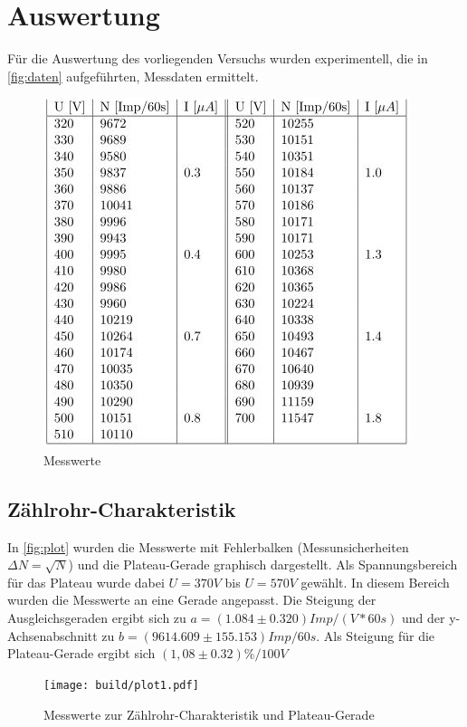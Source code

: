 \section{Auswertung}
\label{sec:Auswertung}
Für die Auswertung des vorliegenden Versuchs wurden experimentell, die in \autoref{fig:daten} aufgeführten, Messdaten ermittelt.

\begin{figure}
  \centering
  \includegraphics{content/daten.JPG}
  \caption{Messwerte \cite{sample}}
  \label{fig:daten}
\end{figure}

\subsection{Zählrohr-Charakteristik}
In \autoref{fig:plot} wurden die Messwerte mit Fehlerbalken (Messunsicherheiten $\Delta N = \sqrt{N}$) und die Plateau-Gerade graphisch dargestellt. Als Spannungsbereich für das Plateau wurde dabei $U=370V$ bis $U=570V$ gewählt. In diesem Bereich wurden die Messwerte an eine Gerade angepasst. Die Steigung der Ausgleichsgeraden ergibt sich zu $a=(1.084 \pm 0.320) Imp/(V*60s)$ und der y-Achsenabschnitt zu $b=(9614.609 \pm 155.153) Imp/60s$. Als Steigung für die Plateau-Gerade ergibt sich $(1,08 \pm 0.32) \%/100V$
\begin{figure}
  \centering
  \texttt{[image: build/plot1.pdf]}
  \caption{Messwerte zur Zählrohr-Charakteristik und Plateau-Gerade}
  \label{fig:plot}
\end{figure}

\newpage
